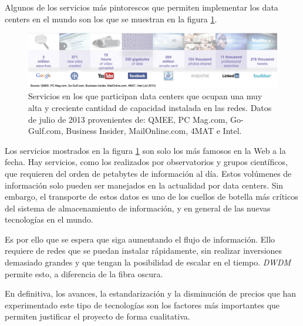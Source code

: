 Algunos de los servicios más pintorescos que permiten implementar los
data centers en el mundo son los que se muestran en la figura
\ref{fig:servicios}.

\begin{figure}[H]
  \centering
  \includegraphics[width=15cm]{Imagenes/servicios.png}
  \caption{Servicios en los que participan data centers que ocupan una
    muy alta y creciente cantidad de capacidad instalada en las
    redes. Datos de julio de 2013 provenientes de: QMEE, PC Mag.com,
    Go-Gulf.com, Business Insider, MailOnline.com, 4MAT e Intel.}
  \label{fig:servicios}
\end{figure}

Los servicios mostrados en la figura \ref{fig:servicios} son solo los
más famosos en la Web a la fecha. Hay servicios, como los realizados
por observatorios y grupos científicos, que requieren del orden de
petabytes de información al día. Estos volúmenes de información solo
pueden ser manejados en la actualidad por data centers. Sin embargo,
el transporte de estos datos es uno de los cuellos de botella más
críticos del sistema de almacenamiento de información, y en general de
las nuevas tecnologías en el mundo.

Es por ello que se espera que siga aumentando el flujo de
información. Ello requiere de redes que se puedan instalar
rápidamente, sin realizar inversiones demasiado grandes y que tengan
la posibilidad de escalar en el tiempo. \emph{DWDM} permite esto, a
diferencia de la fibra oscura.

En definitiva, los avances, la estandarización y la disminución de
precios que han experimentado este tipo de tecnologías son los
factores más importantes que permiten justificar el proyecto de forma
cualitativa.
